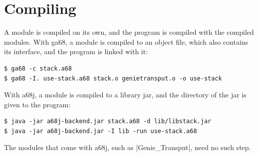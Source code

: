 \section*{Compiling}

A module is compiled on its own, and the program is compiled with the
compiled modules. With ga68, a module is compiled to an object file,
which also contains its interface, and the program is linked with it:
\begin{lstlisting}[style=shell]
$ ga68 -c stack.a68
$ ga68 -I. use-stack.a68 stack.o genietransput.o -o use-stack
\end{lstlisting}
With a68j, a module is compiled to a library jar, and the directory of
the jar is given to the program:
\begin{lstlisting}[style=shell]
$ java -jar a68j-backend.jar stack.a68 -d lib/libstack.jar
$ java -jar a68j-backend.jar -I lib -run use-stack.a68
\end{lstlisting}
The modules that come with a68j, such as \code|Genie_Transput|, need no
such step.
